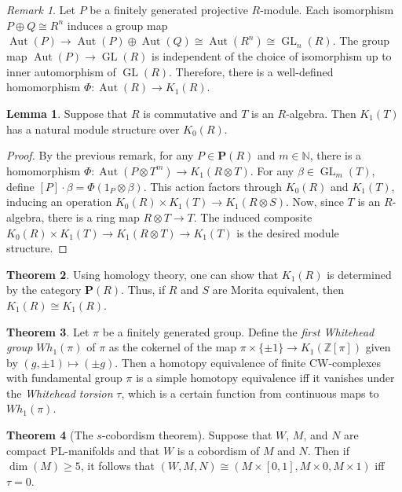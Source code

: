 \documentclass[10pt,letterpaper,cm]{nupset}
\theoremstyle{definition}
\theoremstyle{theorem}
\newtheorem{theorem}{Theorem}
\newtheorem{lemma}[theorem]{Lemma}
\theoremstyle{remark}
\newtheorem{remark}{Remark}
\newcommand{\N}{\mathbb N}
\renewcommand{\P}{\mathbf P}
\newcommand{\Z}{\mathbb Z}
\newcommand{\1}{\mathbf{1}}
\newcommand{\0}{\vec 0}
\DeclareMathOperator*{\GL}{GL}
\DeclareMathOperator{\aut}{Aut}
\begin{document}
\begin{remark}
Let $P$ be a finitely generated projective $R$-module. Each isomorphism $P \oplus Q \cong R^n$ induces a group map $\aut(P) \to \aut(P) \oplus \aut(Q) \cong \aut(R^n) \cong \GL_n(R)$. The group map $\aut(P) \to \GL(R)$ is independent of the choice of isomorphism up to inner automorphism of $\GL(R)$. Therefore, there is a well-defined homomorphism $\Phi: \aut(R) \to K_1(R)$.
\end{remark}

\begin{lemma}
Suppose that $R$ is commutative and $T$ is an $R$-algebra. Then $K_1(T)$ has a natural module structure over $K_0(R)$.
\end{lemma}
\begin{proof}
By the previous remark, for any $P \in \P(R)$ and $m\in \N$, there is a homomorphism $\Phi : \aut(P \otimes T^m) \to K_1(R\otimes T).$ For any $\beta \in \GL_m(T)$, define $[P] \cdot \beta = \Phi(1_P \otimes \beta)$. This action factors through $K_0(R)$ and $K_1(T)$, inducing an operation $K_0(R) \times K_1(T) \to K_1(R \otimes S)$. Now, since $T$ is an $R$-algebra, there is a ring map $R\otimes T \to T$. The induced composite $K_0(R) \times K_1(T) \to K_1(R \otimes T) \to K_1(T)$ is the desired module structure.
\end{proof}

\begin{theorem}
Using homology theory, one can show that $K_1(R)$ is determined by the category $\P(R)$. Thus, if $R$ and $S$ are Morita equivalent, then $K_1(R) \cong K_1(R)$. 
\end{theorem}

\begin{theorem}
Let $\pi$ be a finitely generated group. Define the \textit{first Whitehead group} $Wh_1(\pi)$ of $\pi$ as the cokernel of the map $\pi \times \{\pm 1\}\to K_1(\Z[\pi])$ given by $\left(g, \pm 1\right)\mapsto \left(\pm g\right)$. Then a homotopy equivalence of finite CW-complexes with fundamental group $\pi$ is a simple homotopy equivalence iff it vanishes under the \textit{Whitehead torsion} $\tau$, which is a certain function from continuous maps to $Wh_1(\pi)$.
\end{theorem}

\begin{theorem}[The $s$-cobordism theorem]
Suppose that $W$, $M$, and $N$ are compact PL-manifolds and that $W$ is a cobordism of $M$ and $N$. Then if $\dim(M) \geq 5$, it follows that $(W, M, N) \cong (M \times [0, 1], M \times 0, M \times 1)$ iff $\tau= 0$.
\end{theorem}
\end{document}
